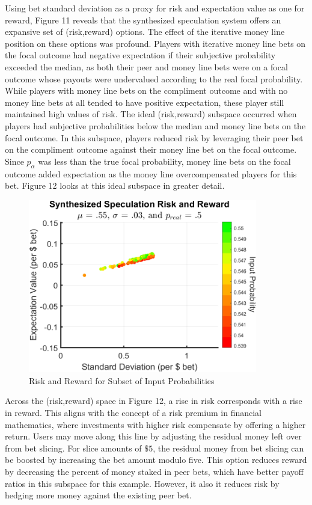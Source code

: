 \documentclass[sn-mathphys-num]{sn-jnl}
\theoremstyle{thmstyleone}%
\theoremstyle{thmstyletwo}%
\theoremstyle{thmstylethree}%
\begin{document}
Using bet standard deviation as a proxy for risk and expectation value as one for reward, Figure 11 reveals that the synthesized speculation system offers an expansive set of (risk,reward) options. The effect of the iterative money line position on these options was profound. Players with iterative money line bets on the focal outcome had negative expectation if their subjective probability exceeded the median, as both their peer and money line bets were on a focal outcome whose payouts were undervalued according to the real focal probability. While players with money line bets on the compliment outcome and with no money line bets at all tended to have positive expectation, these player still maintained high values of risk. The ideal (risk,reward) subspace occurred when players had subjective probabilities below the median and money line bets on the focal outcome. In this subspace, players reduced risk by leveraging their peer bet on the compliment outcome against their money line bet on the focal outcome. Since $p_\alpha$ was less than the true focal probability, money line bets on the focal outcome added expectation as the money line overcompensated players for this bet. Figure 12 looks at this ideal subspace in greater detail. 

\begin{figure}[H]
	\centering
	\includegraphics[width=10cm]{E_vs_V_Individual}
	\caption{Risk and Reward for Subset of Input Probabilities}
\end{figure}

Across the (risk,reward) space in Figure 12, a rise in risk corresponds with a rise in reward. This aligns with the concept of a risk premium in financial mathematics, where investments with higher risk compensate by offering a higher return. Users may move along this line by adjusting the residual money left over from bet slicing. For slice amounts of $\$5$, the residual money from bet slicing can be boosted by increasing the bet amount modulo five. This option reduces reward by decreasing the percent of money staked in peer bets, which have better payoff ratios in this subspace for this example. However, it also it reduces risk by hedging more money against the existing peer bet.
\end{document}
